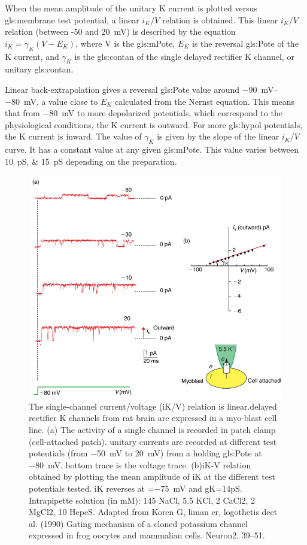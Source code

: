 \documentclass[class={myRUCProject}, crop=false]{standalone}
\begin{document}
When the mean amplitude of the unitary \gls{K} current is plotted versus \gls{gls:membrane} test potential, a linear \(i_K/V\) relation is obtained. This linear \(i_K/V\) relation (between -50 and \qty{20}{\mV}) is described by the equation \(i_K = \gamma_K(V-E_K)\), where V is the \gls{gls:mPote}, \(E_K\) is the reversal \gls{gls:Pote} of the \gls{K} current, and \(\gamma_K\) is the \gls{gls:contan} of the single delayed rectifier \gls{K} channel, or unitary \gls{gls:contan}. 

Linear back-extrapolation gives a reversal \gls{gls:Pote} value around \qtyrange{-90}{-80}{\mV}, a value close to \(E_K\) calculated from the Nernst equation. This means that from \qty{-80}{\mV} to more depolarized potentials, which correspond to the physiological conditions, the \gls{K} current is outward. For more \gls{gls:hypol} potentials, the \gls{K} current is inward. The value of \(\gamma_K\) is given by the slope of the linear \(i_K/V\)curve. It has a constant value at any given \gls{gls:mPote}. This value varies between \qtylist{10;15}{\pico\siemens} depending on the preparation. 

\begin{figure}[H]
   \centering
   \includegraphics[width=0.5\linewidth]{Pictures//Anakin/I-V.K.png}
   \caption{The single-channel current/voltage (iK/V) relation is linear.delayed rectifier \gls{K} channels from rat brain are expressed in a myo-blast cell line. (a) The activity of a single channel is recorded in patch clamp (cell-attached patch). unitary currents are recorded at different test potentials (from \qty{-50}{\mV} to \qty{20}{\mV}) from a holding \gls{gls:Pote} at \qty{-80}{\mV}. bottom trace is the voltage trace. (b)iK-V relation obtained by plotting the mean amplitude of iK at the different test potentials tested. iK reverses at =\qty{-75}{\mV} and gK=14pS. Intrapipette solution (in mM): 145 NaCl, 5.5 KCl, 2 CaCl2, 2 MgCl2, 10 HepeS. Adapted from Koren G, liman er, logothetis deet al. (1990) Gating mechanism of a cloned potassium channel expressed in frog oocytes and mammalian cells. Neuron2, 39–51.}
   \label{fig:rangeThree}
 \end{figure} 
\end{document}
